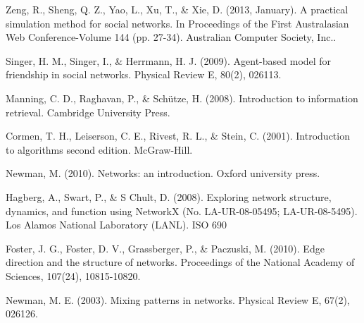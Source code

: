 \documentclass[a4paper,12pt]{article}
\begin{document}
\begin{thebibliography}{9}
  Zeng, R., Sheng, Q. Z., Yao, L., Xu, T., \& Xie, D. (2013, January). A practical simulation method for social networks. In Proceedings of the First Australasian Web Conference-Volume 144 (pp. 27-34). Australian Computer Society, Inc..
  
  Singer, H. M., Singer, I., \& Herrmann, H. J. (2009). Agent-based model for friendship in social networks. Physical Review E, 80(2), 026113.

  Manning, C. D., Raghavan, P., \& Schütze, H. (2008). Introduction to information retrieval. Cambridge University Press.
  
  Cormen, T. H., Leiserson, C. E., Rivest, R. L., \& Stein, C. (2001). Introduction to algorithms second edition. McGraw-Hill.
  
  Newman, M. (2010). Networks: an introduction. Oxford university press.
  
  Hagberg, A., Swart, P., \& S Chult, D. (2008). Exploring network structure, dynamics, and function using NetworkX (No. LA-UR-08-05495; LA-UR-08-5495). Los Alamos National Laboratory (LANL).
ISO 690	

  Foster, J. G., Foster, D. V., Grassberger, P., \& Paczuski, M. (2010). Edge direction and the structure of networks. Proceedings of the National Academy of Sciences, 107(24), 10815-10820.
  
  Newman, M. E. (2003). Mixing patterns in networks. Physical Review E, 67(2), 026126.
\end{thebibliography}
\end{document}
